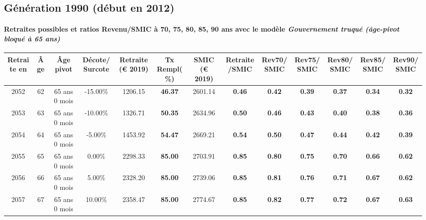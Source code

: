 \newpage 
 
\subsection{Génération 1990 (début en 2012)} 

\paragraph{Retraites possibles et ratios Revenu/SMIC à 70, 75, 80, 85, 90 ans avec le modèle \emph{Gouvernement truqué (âge-pivot bloqué à 65 ans)}}  
 
{ \scriptsize \begin{center} 
\begin{tabular}[htb]{|c|c||c|c||c|c||c||c|c|c|c|c|c|} 
\hline 
 Retraite en &  Âge &  Âge pivot &  Décote/Surcote &  Retraite (\euro{} 2019) &  Tx Rempl(\%) &  SMIC (\euro{} 2019) &  Retraite/SMIC &  Rev70/SMIC &  Rev75/SMIC &  Rev80/SMIC &  Rev85/SMIC &  Rev90/SMIC \\ 
\hline \hline 
 2052 &  62 &  65 ans 0 mois &  -15.00\% &  1206.15 &  {\bf 46.37} &  2601.14 &  {\bf {\color{red} 0.46}} &  {\bf {\color{red} 0.42}} &  {\bf {\color{red} 0.39}} &  {\bf {\color{red} 0.37}} &  {\bf {\color{red} 0.34}} &  {\bf {\color{red} 0.32}} \\ 
\hline 
 2053 &  63 &  65 ans 0 mois &  -10.00\% &  1326.71 &  {\bf 50.35} &  2634.96 &  {\bf {\color{red} 0.50}} &  {\bf {\color{red} 0.46}} &  {\bf {\color{red} 0.43}} &  {\bf {\color{red} 0.40}} &  {\bf {\color{red} 0.38}} &  {\bf {\color{red} 0.36}} \\ 
\hline 
 2054 &  64 &  65 ans 0 mois &  -5.00\% &  1453.92 &  {\bf 54.47} &  2669.21 &  {\bf {\color{red} 0.54}} &  {\bf {\color{red} 0.50}} &  {\bf {\color{red} 0.47}} &  {\bf {\color{red} 0.44}} &  {\bf {\color{red} 0.42}} &  {\bf {\color{red} 0.39}} \\ 
\hline 
 2055 &  65 &  65 ans 0 mois &  0.00\% &  2298.33 &  {\bf 85.00} &  2703.91 &  {\bf {\color{red} 0.85}} &  {\bf {\color{red} 0.80}} &  {\bf {\color{red} 0.75}} &  {\bf {\color{red} 0.70}} &  {\bf {\color{red} 0.66}} &  {\bf {\color{red} 0.62}} \\ 
\hline 
 2056 &  66 &  65 ans 0 mois &  5.00\% &  2328.20 &  {\bf 85.00} &  2739.06 &  {\bf {\color{red} 0.85}} &  {\bf {\color{red} 0.81}} &  {\bf {\color{red} 0.76}} &  {\bf {\color{red} 0.71}} &  {\bf {\color{red} 0.67}} &  {\bf {\color{red} 0.62}} \\ 
\hline 
 2057 &  67 &  65 ans 0 mois &  10.00\% &  2358.47 &  {\bf 85.00} &  2774.67 &  {\bf {\color{red} 0.85}} &  {\bf {\color{red} 0.82}} &  {\bf {\color{red} 0.77}} &  {\bf {\color{red} 0.72}} &  {\bf {\color{red} 0.67}} &  {\bf {\color{red} 0.63}} \\ 
\hline 
\hline 
\end{tabular} 
\end{center} } 
